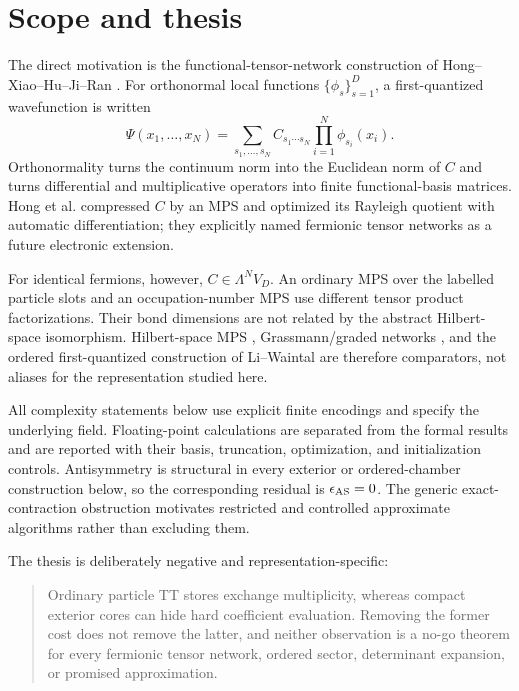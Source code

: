 \documentclass[aps,pra,reprint,superscriptaddress,nofootinbib,longbibliography,showkeys]{revtex4-2}
\theoremstyle{definition}
\begin{document}
\section{Scope and thesis}

The direct motivation is the functional-tensor-network construction of
Hong--Xiao--Hu--Ji--Ran \cite{Hong2022FunctionalTN}.  For orthonormal local
functions $\{\phi_s\}_{s=1}^D$, a first-quantized wavefunction is written
\begin{equation}
 \Psi(x_1,\ldots,x_N)=
 \sum_{s_1,\ldots,s_N}C_{s_1\cdots s_N}
 \prod_{i=1}^N\phi_{s_i}(x_i).
 \label{eq:functional-expansion}
\end{equation}
Orthonormality turns the continuum norm into the Euclidean norm of $C$ and
turns differential and multiplicative operators into finite functional-basis
matrices.  Hong et al. compressed $C$ by an MPS and optimized its Rayleigh
quotient with automatic differentiation; they explicitly named fermionic
tensor networks as a future electronic extension.

For identical fermions, however, $C\in\Lambda^N V_D$.  An ordinary MPS over
the labelled particle slots and an occupation-number MPS use different tensor
product factorizations.  Their bond dimensions are not related by the abstract
Hilbert-space isomorphism.  Hilbert-space MPS \cite{LiChan2016HSMPS},
Grassmann/graded networks \cite{KongZhuXie2026GrassmannTN}, and the ordered
first-quantized construction of Li--Waintal
\cite{LiWaintal2026FirstQuantization} are therefore comparators, not aliases
for the representation studied here.

All complexity statements below use explicit finite encodings and specify the
underlying field.  Floating-point calculations are separated from the formal
results and are reported with their basis, truncation, optimization, and
initialization controls.  Antisymmetry is structural in every exterior or
ordered-chamber construction below, so the corresponding residual is
$\epsilon_{\rm AS}=0$.  The generic exact-contraction obstruction motivates
restricted and controlled approximate algorithms rather than excluding them.

The thesis is deliberately negative and representation-specific:
\begin{quote}
Ordinary particle TT stores exchange multiplicity, whereas compact exterior
cores can hide hard coefficient evaluation.  Removing the former cost does
not remove the latter, and neither observation is a no-go theorem for every
fermionic tensor network, ordered sector, determinant expansion, or promised
approximation.
\end{quote}
\end{document}
